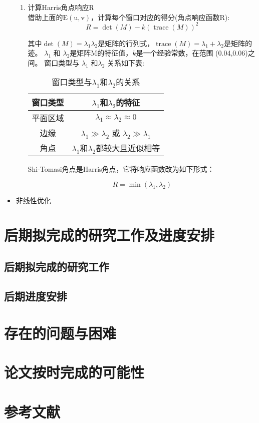 \begin{itemize}
\begin{enumerate}
        \item 计算Harris角点响应\(\mathrm{R}\) \\
        借助上面的\(\mathrm{E(u,v)}\)，计算每个窗口对应的得分(角点响应函数R):
        \[R=\det(M)-k(\operatorname{trace}(M))^2\]
        
        其中$\det(M)=\lambda_1\lambda_2$是矩阵的行列式，$\operatorname{trace}(M)=\lambda_1+\lambda_2$是矩阵的迹。
        $\lambda_1$ 和 $\lambda_2$是矩阵M的特征值，$k$是一个经验常数，在范围 (0.04,0.06)之间。
        窗口类型与 $\lambda_1$ 和$\lambda_2$ 关系如下表:\\
        \begin{table}[htbp]
            \centering
            \caption{窗口类型与$\lambda_1$和$\lambda_2$的关系}
            \begin{tabular}{cc}
            \toprule
            窗口类型 & $\lambda_1$和$\lambda_2$的特征 \\
            \midrule
            平面区域 & $\lambda_1 \approx \lambda_2 \approx 0$ \\
            边缘 & $\lambda_1 \gg \lambda_2$ 或 $\lambda_2 \gg \lambda_1$ \\
            角点 & $\lambda_1$和$\lambda_2$都较大且近似相等 \\
            \bottomrule
            \end{tabular}
        \end{table}
        Shi-Tomasi角点是Harris角点，它将响应函数改为如下形式：

        \[R=\min(\lambda_1,\lambda_2)\]
\end{enumerate}
   
        \item 非线性优化
\end{itemize}


\section{后期拟完成的研究工作及进度安排}
\subsection{后期拟完成的研究工作}
\subsection{后期进度安排}
\section{存在的问题与困难}
\section{论文按时完成的可能性}
\section{参考文献}



